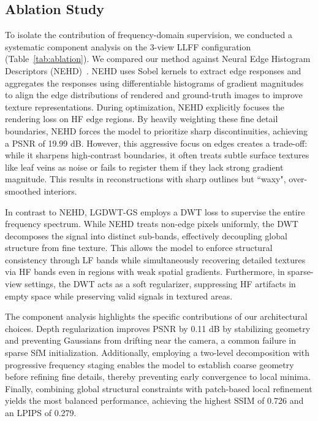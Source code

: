 \subsection{Ablation Study}
\label{sec:ablation}

To isolate the contribution of frequency-domain supervision, we conducted a systematic component analysis on the 3-view LLFF configuration (Table~\ref{tab:ablation}). We compared our method against Neural Edge Histogram Descriptors (NEHD)~\cite{peeples2025histogram}. NEHD uses Sobel kernels \cite{sobel19683x3} to extract edge responses and aggregates the responses using differentiable histograms of gradient magnitudes to align the edge distributions of rendered and ground-truth images to improve texture representations. During optimization, NEHD explicitly focuses the rendering loss on HF edge regions. By heavily weighting these fine detail boundaries, NEHD forces the model to prioritize sharp discontinuities, achieving a PSNR of 19.99 dB. However, this aggressive focus on edges creates a trade-off: while it sharpens high-contrast boundaries, it often treats subtle surface textures like leaf veins as noise or fails to register them if they lack strong gradient magnitude. This results in reconstructions with sharp outlines but ``waxy", over-smoothed interiors.

In contrast to NEHD, LGDWT-GS employs a DWT loss to supervise the entire frequency spectrum. While NEHD treats non-edge pixels uniformly, the DWT decomposes the signal into distinct sub-bands, effectively decoupling global structure from fine texture. This allows the model to enforce structural consistency through LF bands while simultaneously recovering detailed textures via HF bands even in regions with weak spatial gradients. Furthermore, in sparse-view settings, the DWT acts as a soft regularizer, suppressing HF artifacts in empty space while preserving valid signals in textured areas.

The component analysis highlights the specific contributions of our architectural choices. Depth regularization improves PSNR by 0.11 dB by stabilizing geometry and preventing Gaussians from drifting near the camera, a common failure in sparse SfM initialization. Additionally, employing a two-level decomposition with progressive frequency staging enables the model to establish coarse geometry before refining fine details, thereby preventing early convergence to local minima. Finally, combining global structural constraints with patch-based local refinement yields the most balanced performance, achieving the highest SSIM of 0.726 and an LPIPS of 0.279.


